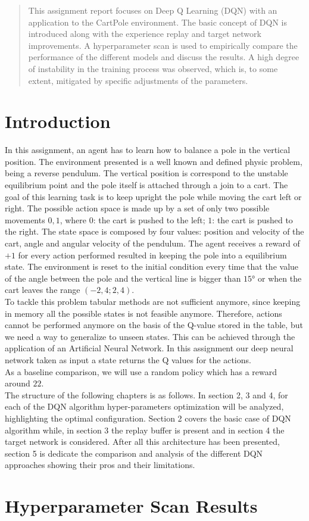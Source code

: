 \documentclass{article}
\begin{document}
\begin{abstract}
This assignment report focuses on Deep Q Learning (DQN)
with an application to the CartPole environment. 
The basic concept of DQN is introduced along with the experience replay 
and target network improvements.
A hyperparameter scan is used to empirically compare the performance of
the different models and discuss the results.    
A high degree of instability in the training process was observed, 
which is, to some extent, mitigated by specific adjustments of the parameters.
\end{abstract}

\section{Introduction}
\label{sec_introduction}
In this assignment, an agent has to learn how to balance a pole in the vertical position. The environment \cite{1606.01540} presented is a well known and defined physic problem, being a reverse pendulum. The vertical position is correspond to the unstable equilibrium point and the pole itself is attached through a join to a 
cart. The goal of this learning task is to keep upright the pole while moving the cart left or right.
The possible action space is made up by a set of only two possible movements ${0,1}$, where $0$: the cart is pushed to the left; $1$: the cart is pushed to the right. The state space is composed by four values: position and velocity of the cart, angle and angular velocity of the pendulum.
The agent receives a reward of $+1$ for every action performed resulted in keeping the pole into a equilibrium state. The environment is reset to the initial condition every time that the value of the angle between the pole and the vertical line is bigger than $15°$ or when the cart leaves the range $(-2,4;2,4)$.\\
To tackle this problem tabular methods are not sufficient anymore, since keeping in memory all the possible states is not feasible anymore. Therefore, actions cannot be performed anymore on the basis of the Q-value stored in the table, but we need a way to generalize to unseen states. This can be achieved through the application of an Artificial Neural Network. In this assignment our deep neural network taken as input a state returns the Q values for the actions.\\
As a baseline comparison, we will use a random policy which has a reward around $22$.\\ 
The structure of the following chapters is as follows. In section 2, 3 and 4, for each of the DQN algorithm hyper-parameters optimization will be analyzed, highlighting the optimal configuration. Section 2 covers the basic case of DQN algorithm while, in section 3 the replay buffer is present and in section 4 the target network is considered. After all this architecture has been presented, section 5 is dedicate the comparison and analysis of the different DQN approaches showing their pros and their limitations.


\nocite{DBLP:books/sp/Plaat22}





\appendix
\section{Hyperparameter Scan Results}
\end{document}
